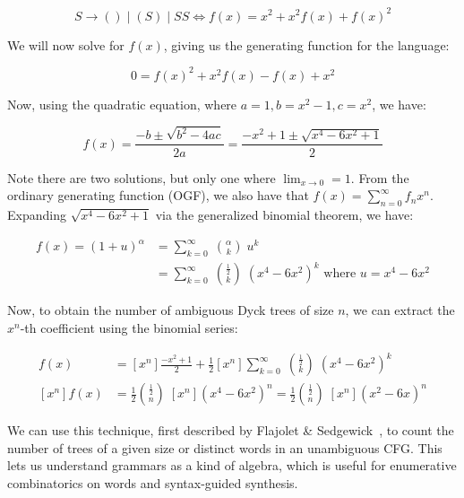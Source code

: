 \begin{equation}
    S \rightarrow ( ) \mid ( S ) \mid S S \Longleftrightarrow f(x) = x^2 + x^2 f(x) + f(x)^2
\end{equation}

\noindent We will now solve for $f(x)$, giving us the generating function for the language:

\begin{equation}
  0 = f(x)^2 + x^2 f(x) - f(x) + x^2
\end{equation}

\noindent Now, using the quadratic equation, where $a = 1, b = x^2 - 1, c = x^2$, we have:

\begin{equation}
  f(x) = \frac{-b \pm \sqrt{b^2 - 4ac}}{2a} = \frac{-x^2 + 1 \pm \sqrt{x^4 - 6x^2 + 1}}{2}
\end{equation}

\noindent Note there are two solutions, but only one where $\lim_{x\rightarrow 0} = 1$. From the ordinary generating function (OGF), we also have that $f(x)=\sum _{n=0}^{\infty }f_nx^{n}$. Expanding $\sqrt{x^4 - 6x^2 + 1}$ via the generalized binomial theorem, we have:

\begin{align}
f(x) = (1+u)^{\alpha }&=\sum _{k=0}^{\infty }\;{\binom {\alpha }{k}}\;u^{k}\\
  &=\sum _{k=0}^{\infty }\;{\binom {\frac{1}{2} }{k}}\;(x^4 - 6x^2)^{k} \text{ where } u = x^4-6x^2
\end{align}

Now, to obtain the number of ambiguous Dyck trees of size $n$, we can extract the $x^n$-th coefficient using the binomial series:

\begin{align}
  [x^n]f(x) &= [x^n]\frac{-x^2 + 1}{2} + \frac{1}{2}[x^n]\sum _{k=0}^{\infty }\;{\binom {\frac{1}{2} }{k}}\;(x^4 - 6x^2)^{k}\\
  [x^n]f(x) &= \frac{1}{2}{\binom {\frac{1}{2} }{n}}\;[x^n](x^4 - 6x^2)^n = \frac{1}{2}{\binom {\frac{1}{2} }{n}}\;[x^n](x^2 - 6x)^n
\end{align}

We can use this technique, first described by Flajolet \& Sedgewick~\cite{flajolet2009analytic}, to count the number of trees of a given size or distinct words in an unambiguous CFG. This lets us understand grammars as a kind of algebra, which is useful for enumerative combinatorics on words and syntax-guided synthesis.

